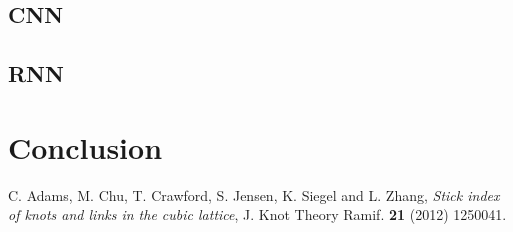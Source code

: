 \documentclass[12pt]{report}
\numberwithin{figure}{chapter}
\theoremstyle{plain}
\theoremstyle{definition}
\theoremstyle{corollary}
\theoremstyle{definition}
\theoremstyle{plain}
\theoremstyle{definition}
\theoremstyle{plain}
\begin{document}
\section{CNN}

\section{RNN}

\chapter{Conclusion}



\newpage



\newpage

\begin{thebibliography}{AA}
 C. Adams, M. Chu, T. Crawford, S. Jensen, K. Siegel and L. Zhang,
    {\em Stick index of knots and links in the cubic lattice},
    J. Knot Theory Ramif. \textbf{21} (2012) 1250041.



\end{thebibliography}



%
%
%
%
%
\end{document}
